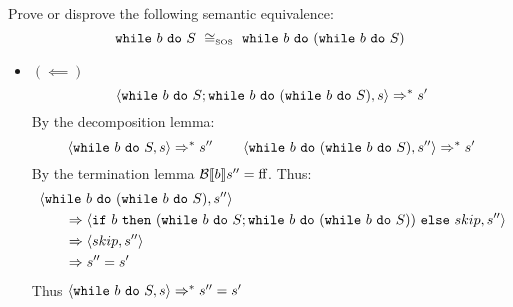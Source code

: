 \begin{exercise}{
    Prove or disprove the following semantic equivalence:
    \[ \wwhile{b}{S}\ \SOScong\ \wwhile{b}{(\wwhile{b}{S})} \]
}
\begin{itemize}
\begin{itemize}
\begin{align*}
                        \\&\qquad\Rightarrow^* \instr{\wwhile{b}{(\wwhile{b}{S})}}{s'}
                        \\&\qquad\Rightarrow \instr{\wif{b}{(\wwhile{b}{S}; \wwhile{b}{(\wwhile{b}{S})})}{skip}}{s'}
                        \\&\qquad\Rightarrow \instr{skip}{s'}
                        \\&\qquad\Rightarrow s'
                    \end{align*}
                \item $(\impliedby)$
                    \[ \left<\texttt{while}\ b\ \texttt{do}\ S; \texttt{while}\ b\ \texttt{do}\ (\texttt{while}\ b\ \texttt{do}\ S), s\right> \Rightarrow^* s' \]
                    By the decomposition lemma:
                    \[
                        \left<\texttt{while}\ b\ \texttt{do}\ S, s\right> \Rightarrow^* s''
                        \qquad
                        \left<\texttt{while}\ b\ \texttt{do}\ (\texttt{while}\ b\ \texttt{do}\ S), s''\right> \Rightarrow^* s'
                    \]
                    By the termination lemma $\mathcal{B} \llbracket b \rrbracket s'' = \text{ff}$. Thus:
                    \begin{align*}
                        &\left<\texttt{while}\ b\ \texttt{do}\ (\texttt{while}\ b\ \texttt{do}\ S), s''\right>
                        \\&\qquad\Rightarrow \left<\texttt{if}\ b\ \texttt{then}\ (\texttt{while}\ b\ \texttt{do}\ S; \texttt{while}\ b\ \texttt{do}\ (\texttt{while}\ b\ \texttt{do}\ S))\ \texttt{else}\ skip, s''\right>
                        \\&\qquad\Rightarrow \left<skip, s''\right>
                        \\&\qquad\Rightarrow s'' = s'
                    \end{align*}
                    Thus $\left<\texttt{while}\ b\ \texttt{do}\ S, s\right> \Rightarrow^* s'' = s'$
            \end{itemize}
    \end{itemize}
\end{exercise}
